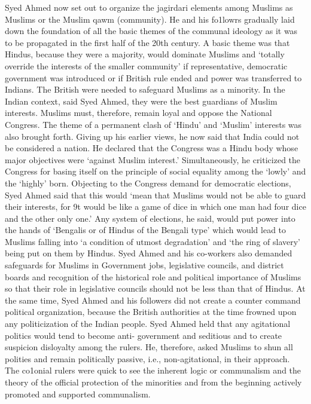 \begin{multicols}{2}
Syed Ahmed now set out to organize the jagirdari elements among Muslims as Muslims or the Muslim qawm (community). He and his fo1lowrs gradually laid down the foundation of all the basic themes of the communal ideology as it was to be propagated in the first half of the 20th century. A basic theme was that Hindus, because they were a majority, would dominate Muslims and `totally override the interests of the smaller community' if representative, democratic government was introduced or if British rule ended and power was transferred to Indians. The British were needed to safeguard Muslims as a minority. In the Indian context, said Syed Ahmed, they were the best guardians of Muslim interests. Muslims must, therefore, remain loyal and oppose the National Congress. The theme of a permanent clash of `Hindu' and `Muslim' interests was also brought forth. Giving up his earlier views, he now said that India could not be considered a nation. He declared that the Congress was a Hindu body whose major objectives were `against Muslim interest.' Simultaneously, he criticized the Congress for basing itself on the principle of social equality among the `lowly' and the `highly' born. Objecting to the Congress demand for democratic elections, Syed Ahmed said that this would `mean that Muslims would not be able to guard their interests, for 9t would be like a game of dice in which one man had four dice and the other only one.' Any system of elections, he said, would put power into the hands of `Bengalis or of Hindus of the Bengali type' which would lead to Muslims falling into `a condition of utmost degradation' and `the ring of slavery' being put on them by Hindus. Syed Ahmed and his co-workers also demanded safeguards for Muslims in Government jobs, legislative councils, and district boards and recognition of the historical role and political importance of Muslims so that their role in legislative councils should not be less than that of Hindus. At the same time, Syed Ahmed and his followers did not create a counter command political organization, because the British authorities at the time frowned upon any politicization of the Indian people. Syed Ahmed held that any agitational politics would tend to become anti- government and seditious and to create suspicion disloyalty among the rulers. He, therefore, asked Muslims to shun all polities and remain politically passive, i.e., non-agitational, in their approach. The co1onial rulers were quick to see the inherent logic or communalism and the theory of the official protection of the minorities and from the beginning actively promoted and supported communalism. 


\end{multicols}
